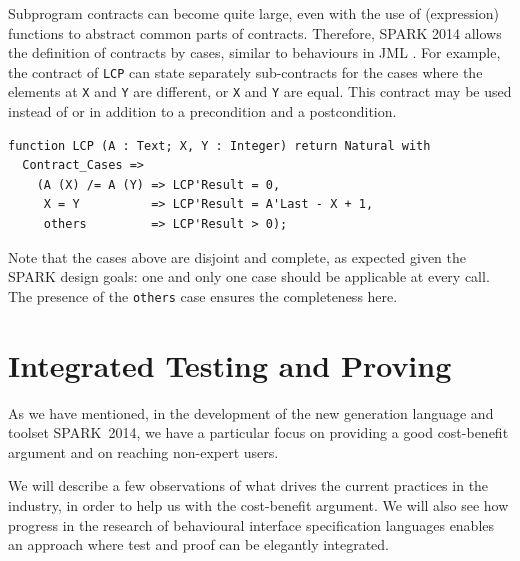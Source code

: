 \documentclass[sttt,final]{svjour}
\newcommand{\newspark}{SPARK~2014\xspace}
\begin{document}
Subprogram contracts can become quite large, even with the use of (expression)
functions to abstract common parts of contracts. Therefore, SPARK 2014 allows
the definition of contracts by cases, similar to behaviours in
JML \cite{JML}. For example, the contract of \verb|LCP| can state separately
sub-contracts for the cases where the elements at \verb|X| and \verb|Y| are
different, or \verb|X| and \verb|Y| are equal. This contract may be used
instead of or in addition to a precondition and a postcondition.

\begin{lstlisting}
function LCP (A : Text; X, Y : Integer) return Natural with
  Contract_Cases =>
    (A (X) /= A (Y) => LCP'Result = 0,
     X = Y          => LCP'Result = A'Last - X + 1,
     others         => LCP'Result > 0);
\end{lstlisting}

Note that the cases above are disjoint and complete, as expected given
the SPARK design goals: one and only one case should be applicable at
every call. The presence of the \verb|others| case ensures the
completeness here.

\section{Integrated Testing and Proving}
\label{hilite}
As we have mentioned, in the development of the new generation
language and toolset \newspark, we have a particular focus on
providing a good cost-benefit argument and on reaching non-expert
users.

We will describe a few observations of what drives the current
practices in the industry, in order to help us with the cost-benefit
argument. We will also see how progress in the research of behavioural
interface specification languages \cite{HatcliffLLMP12} enables an
approach where test and proof can be elegantly integrated.
\end{document}
